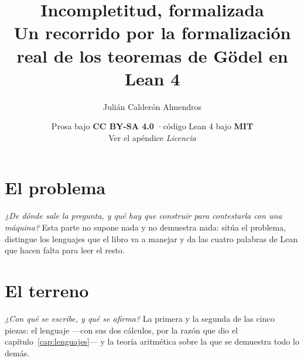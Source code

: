 \documentclass[11pt,openright]{book}
\title{\bfseries Incompletitud, formalizada\\[0.4em]
       \large Un recorrido por la formalización real de los teoremas de Gödel
       en Lean 4}
\author{Julián Calderón Almendros}
\date{\normalsize\vspace{2em}
  Prosa bajo \textbf{CC BY-SA 4.0} \quad·\quad código Lean 4 bajo \textbf{MIT}\\[0.3em]
  {\small Ver el apéndice \emph{Licencia}}}
\begin{document}
\frontmatter
\maketitle


\tableofcontents

\mainmatter

\part{El problema}
\label{parte:problema}

\noindent \emph{¿De dónde sale la pregunta, y qué hay que construir para contestarla con una máquina?} Esta parte no supone nada y no demuestra nada: sitúa el problema, distingue los lenguajes que el libro va a manejar y da las cuatro palabras de Lean que hacen falta para leer el resto.





\part{El terreno}
\label{parte:terreno}

\noindent \emph{¿Con qué se escribe, y qué se afirma?} La primera y la segunda de las cinco piezas: el lenguaje —con sus dos cálculos, por la razón que dio el capítulo~\ref{cap:lenguajes}— y la teoría aritmética sobre la que se demuestra todo lo demás.
\end{document}
